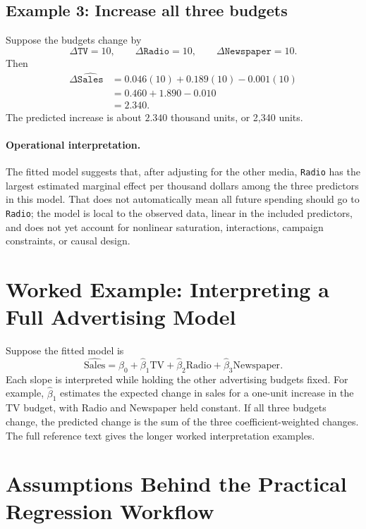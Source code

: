 {\subsection*{Example 3: Increase all three budgets}

Suppose the budgets change by
\begin{equation}
  \Delta\texttt{TV}=10,\qquad \Delta\texttt{Radio}=10,\qquad \Delta\texttt{Newspaper}=10.
\end{equation}
Then
\begin{align}
  \Delta\widehat{\texttt{Sales}}
  &=0.046(10)+0.189(10)-0.001(10)\\
  &=0.460+1.890-0.010\\
  &=2.340.
\end{align}
The predicted increase is about \(2.340\) thousand units, or 2,340 units.

\paragraph{Operational interpretation.}
The fitted model suggests that, after adjusting for the other media, \texttt{Radio} has the largest estimated marginal effect per thousand dollars among the three predictors in this model.  That does not automatically mean all future spending should go to \texttt{Radio}; the model is local to the observed data, linear in the included predictors, and does not yet account for nonlinear saturation, interactions, campaign constraints, or causal design.
}{
\section{Worked Example: Interpreting a Full Advertising Model}

Suppose the fitted model is
\begin{equation}
  \widehat{\text{Sales}}
  =\widehat{\beta}_0+\widehat{\beta}_1\text{TV}+\widehat{\beta}_2\text{Radio}+\widehat{\beta}_3\text{Newspaper}.
\end{equation}
Each slope is interpreted while holding the other advertising budgets fixed.  For example, \(\widehat{\beta}_1\) estimates the expected change in sales for a one-unit increase in the TV budget, with Radio and Newspaper held constant.  If all three budgets change, the predicted change is the sum of the three coefficient-weighted changes.  The full reference text gives the longer worked interpretation examples.
}
\section{Assumptions Behind the Practical Regression Workflow}

